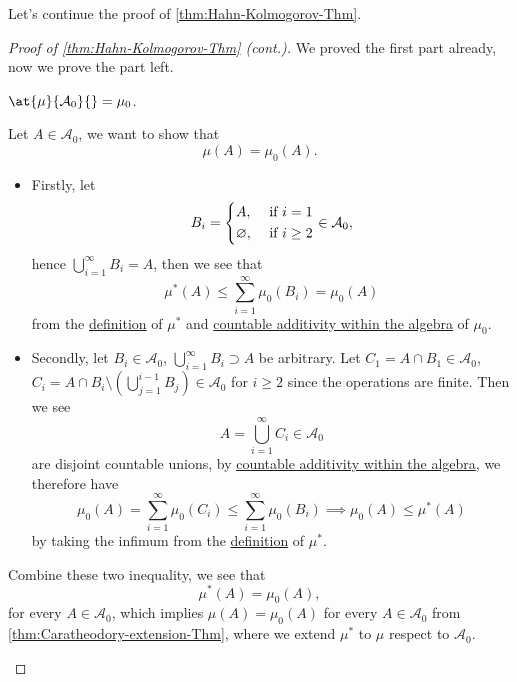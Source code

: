 Let's continue the proof of \autoref{thm:Hahn-Kolmogorov-Thm}.
\begin{proof}[Proof of \autoref{thm:Hahn-Kolmogorov-Thm} (cont.)]\label{pf:Hahn-Kolmogorov-Thm-cont}
	We proved the first part already, now we prove the part left.
	\begin{claim}
		\(\at{\mu }{\mathcal{\MakeUppercase{a}} _0}{} = \mu _0\).
	\end{claim}
	\begin{explanation}
		Let \(A\in \mathcal{A} _0\), we want to show that
		\[
			\mu (A) = \mu_0(A).
		\]
		\begin{itemize}
			\item Firstly, let
			      \[
				      B_{i} = \begin{dcases}
					      A,            & \text{ if } i= 1    \\
					      \varnothing , & \text{ if } i\geq 2
				      \end{dcases}\in \mathcal{A} _0,
			      \]
			      hence \(\bigcup\limits_{i=1}^{\infty} B_{i} = A\), then we see that
			      \[
				      \mu ^{*} (A)\leq \sum\limits_{i=1}^{\infty} \mu _0(B_{i}) = \mu _0(A)
			      \]
			      from the \hyperref[prop:outer-measure]{definition} of \(\mu ^{*} \) and \hyperref[def:pre-measure-countable-additivity-within-the-algebra]{countable additivity within the algebra}
			      of \(\mu _0\).
			\item Secondly, let \(B_{i}\in \mathcal{A} _0\), \(\bigcup\limits_{i=1}^{\infty} B_{i}\supset A\) be arbitrary.
			      Let \(C_1 = A\cap B_1\in \mathcal{A} _0\), \(C_{i} = A\cap B_{i}\setminus \left(\bigcup\limits_{j=1}^{i-1} B_{j}\right)\in \mathcal{A} _0\) for \(i\geq 2\)
			      since the operations are finite. Then we see
			      \[
				      A = \bigcup\limits_{i=1}^{\infty} C_{i}\in \mathcal{A} _0
			      \]
			      are disjoint countable unions, by \hyperref[def:pre-measure-countable-additivity-within-the-algebra]{countable additivity within the algebra},
			      we therefore have
			      \[
				      \mu _0(A) = \sum\limits_{i=1}^{\infty} \mu _0(C_{i}) \leq \sum\limits_{i=1}^{\infty} \mu_0 (B_{i})\implies \mu _0(A)\leq \mu ^{*} (A)
			      \]
			      by taking the infimum from the \hyperref[prop:outer-measure]{definition} of \(\mu ^{*} \).
		\end{itemize}
		Combine these two inequality, we see that
		\[
			\mu ^{*} (A) = \mu _0(A),
		\]
		for every \(A\in\mathcal{A} _0\), which implies \(\mu (A) = \mu _0(A)\) for every \(A\in \mathcal{A}_0\) from \autoref{thm:Caratheodory-extension-Thm},
		where we extend \(\mu ^{*} \) to \(\mu \) respect to \(\mathcal{A}_0\).
	\end{explanation}
\end{proof}

